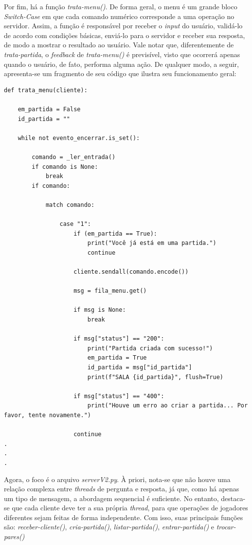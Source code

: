 \documentclass[11pt,a4paper]{article}
\begin{document}
Por fim, há a função \textit{trata-menu()}. De forma geral, o menu é um grande bloco \textit{Switch-Case} em que cada comando numérico corresponde a uma operação no servidor. Assim, a função é responsável por receber o \textit{input} do usuário, validá-lo de acordo com condições básicas, enviá-lo para o servidor e receber sua resposta, de modo a mostrar o resultado ao usuário. Vale notar que, diferentemente de \textit{trata-partida}, o \textit{feedback} de \textit{trata-menu()} é previsível, visto que ocorrerá apenas quando o usuário, de fato, performa alguma ação. De qualquer modo, a seguir, apresenta-se um fragmento de seu código que ilustra seu funcionamento geral:

\begin{verbatim}
def trata_menu(cliente):

    em_partida = False
    id_partida = ""

    while not evento_encerrar.is_set():

        comando = _ler_entrada()
        if comando is None:
            break
        if comando:

            match comando:

                case "1":
                    if (em_partida == True):
                        print("Você já está em uma partida.")
                        continue
                    
                    cliente.sendall(comando.encode())

                    msg = fila_menu.get()

                    if msg is None:
                        break

                    if msg["status"] == "200":
                        print("Partida criada com sucesso!")
                        em_partida = True
                        id_partida = msg["id_partida"]
                        print(f"SALA {id_partida}", flush=True)

                    if msg["status"] == "400":
                        print("Houve um erro ao criar a partida... Por favor, tente novamente.")

                    continue
.
.
.
\end{verbatim}

Agora, o foco é o arquivo \textit{serverV2.py}. À priori, nota-se que não houve uma relação complexa entre \textit{threads} de pergunta e resposta, já que, como há apenas um tipo de mensagem, a abordagem sequencial é suficiente. No entanto, destaca-se que cada cliente deve ter a sua própria \textit{thread}, para que operações de jogadores diferentes sejam feitas de forma independente. Com isso, suas principais funções são: \textit{receber-cliente()}, \textit{cria-partida()}, \textit{listar-partida()}, \textit{entrar-partida()} e \textit{trocar-pares()}
\end{document}
